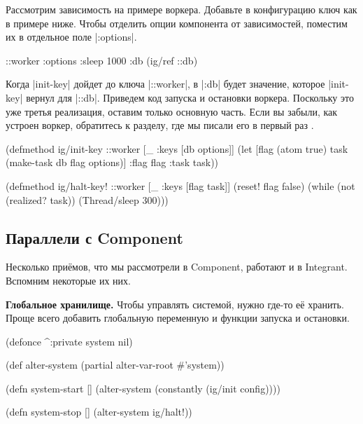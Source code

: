 Рассмотрим зависимость на примере воркера. Добавьте в конфигурацию ключ как в
примере ниже. Чтобы отделить опции компонента от зависимостей, поместим их в
отдельное поле \spverb|:options|.

\begin{english}
  \begin{clojure}
{::worker {:options {:sleep 1000}
           :db (ig/ref ::db)}}
  \end{clojure}
\end{english}

Когда \spverb|init-key| дойдет до ключа \spverb|::worker|, в \spverb|:db| будет
значение, которое \spverb|init-key| вернул для \spverb|::db|. Приведем код
запуска и остановки воркера. Поскольку это уже третья реализация, оставим только
основную часть. Если вы забыли, как устроен воркер, обратитесь к разделу, где мы
писали его в первый раз .

\begin{english}
  \begin{clojure}
(defmethod ig/init-key ::worker
  [_ {:keys [db options]}]
  (let [flag (atom true)
        task (make-task db flag options)]
    {:flag flag :task task}))

(defmethod ig/halt-key! ::worker
  [_ {:keys [flag task]}]
  (reset! flag false)
  (while (not (realized? task))
    (Thread/sleep 300)))
  \end{clojure}
\end{english}

\subsection{Параллели с Component}

Несколько при\"{е}мов, что мы рассмотрели в Component, работают и в
Integrant. Вспомним некоторые их них.

\textbf{Глобальное хранилище.} Чтобы управлять системой, нужно где-то е\"{е}
хранить. Проще всего добавить глобальную переменную и функции запуска и
остановки.

\begin{english}
  \begin{clojure}
(defonce ^:private system nil)

(def alter-system (partial alter-var-root #'system))

(defn system-start []
  (alter-system (constantly (ig/init config))))

(defn system-stop []
  (alter-system ig/halt!))
  \end{clojure}
\end{english}

